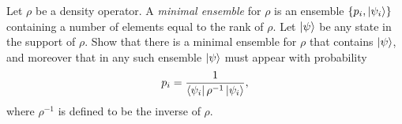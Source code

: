 \documentclass{article}
\begin{document}
\begin{exercise}
  Let $\rho$ be a density operator. A \textit{minimal ensemble} for $\rho$ is an ensemble $\{p_i,\ket{\psi_i}\}$ containing a number of elements equal to the rank of $\rho$. Let $\ket{\psi}$ be any state in the support of $\rho$. Show that there is a minimal ensemble for $\rho$ that contains $\ket\psi$, and moreover that in any such ensemble $\ket\psi$ must appear with probability
  \[p_i=\frac{1}{\bra{\psi_i}\rho^{-1}\ket{\psi_i}},\]
  where $\rho^{-1}$ is defined to be the inverse of $\rho$.
\end{exercise}
\end{document}

